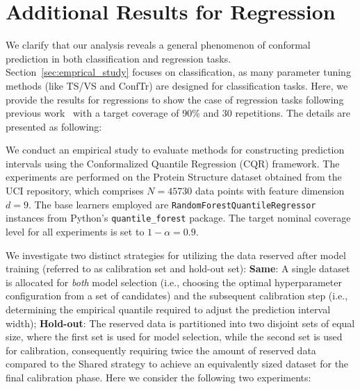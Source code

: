 \documentclass{article}
\newcommand{\1}{\mathbbm{1}}
\theoremstyle{plain}
\theoremstyle{definition}
\theoremstyle{remark}
\begin{document}
\section{Additional Results for Regression}
\label{sec:additional_results_regression}
We clarify that our analysis reveals a general phenomenon of conformal prediction in both classification and regression tasks. Section~\ref{sec:emprical_study} focuses on classification, as many parameter tuning methods (like TS/VS and ConfTr) are designed for classification tasks. Here, we provide the results for regressions to show the case of regression tasks following previous work~\citep{liang2024conformal} with a target coverage of 90\% and 30 repetitions. 
The details are presented as following:


We conduct an empirical study to evaluate methods for constructing prediction intervals using the Conformalized Quantile Regression (CQR) framework. The experiments are performed on the Protein Structure dataset obtained from the UCI repository, which comprises $N=45730$ data points with feature dimension $d=9$. 
The base learners employed are \texttt{RandomForestQuantileRegressor} instances from Python's \texttt{quantile\_forest} package. 
The target nominal coverage level for all experiments is set to $1-\alpha = 0.9$.

We investigate two distinct strategies for utilizing the data reserved after model training (referred to as calibration set and hold-out set):
\textbf{Same}: A single dataset is allocated for \textit{both} model selection (i.e., choosing the optimal hyperparameter configuration from a set of candidates) and the subsequent calibration step (i.e., determining the empirical quantile required to adjust the prediction interval width); \textbf{Hold-out}: The reserved data is partitioned into two disjoint sets of equal size, where the first set is used for model selection, while the second set is used for calibration, consequently requiring twice the amount of reserved data compared to the Shared strategy to achieve an equivalently sized dataset for the final calibration phase.
Here we consider the following two experiments:
\end{document}
